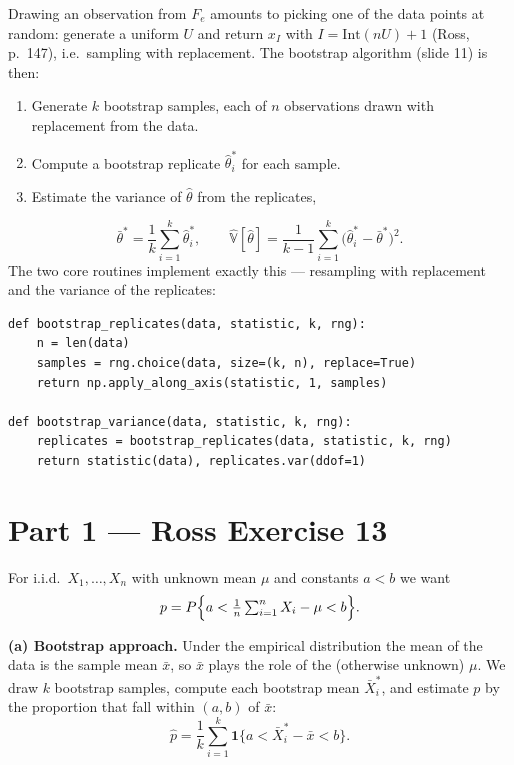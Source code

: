 Drawing an observation from $F_e$ amounts to picking one of the data points at
random: generate a uniform $U$ and return $x_I$ with $I=\mathrm{Int}(nU)+1$
(Ross, p.\ 147), i.e.\ sampling with replacement. The bootstrap algorithm
(slide 11) is then:
\begin{enumerate}
    \item Generate $k$ bootstrap samples, each of $n$ observations drawn with
          replacement from the data.
    \item Compute a bootstrap replicate $\hat\theta^*_i$ for each sample.
    \item Estimate the variance of $\hat\theta$ from the replicates,
\end{enumerate}
\begin{equation}
    \bar\theta^* = \frac{1}{k}\sum_{i=1}^{k}\hat\theta^*_i,
    \qquad
    \hat{\mathbb{V}}[\hat\theta] =
        \frac{1}{k-1}\sum_{i=1}^{k}\bigl(\hat\theta^*_i-\bar\theta^*\bigr)^2 .
    \label{eq:boot-var}
\end{equation}
The two core routines implement exactly this --- resampling with replacement and
the variance of the replicates:
\begin{verbatim}
def bootstrap_replicates(data, statistic, k, rng):
    n = len(data)
    samples = rng.choice(data, size=(k, n), replace=True)
    return np.apply_along_axis(statistic, 1, samples)

def bootstrap_variance(data, statistic, k, rng):
    replicates = bootstrap_replicates(data, statistic, k, rng)
    return statistic(data), replicates.var(ddof=1)
\end{verbatim}

\section*{Part 1 --- Ross Exercise 13}

For i.i.d.\ $X_1,\dots,X_n$ with unknown mean $\mu$ and constants $a<b$ we want
\begin{equation}
    p = P\Bigl\{a < \tfrac{1}{n}\textstyle\sum_{i=1}^{n} X_i - \mu < b\Bigr\}.
    \label{eq:p13}
\end{equation}

\textbf{(a) Bootstrap approach.} Under the empirical distribution the mean of
the data is the sample mean $\bar x$, so $\bar x$ plays the role of the
(otherwise unknown) $\mu$. We draw $k$ bootstrap samples, compute each bootstrap
mean $\bar X^*_i$, and estimate $p$ by the proportion that fall within $(a,b)$
of $\bar x$:
\begin{equation}
    \hat p = \frac{1}{k}\sum_{i=1}^{k}
             \mathbf{1}\bigl\{a < \bar X^*_i - \bar x < b\bigr\}.
    \label{eq:phat}
\end{equation}

